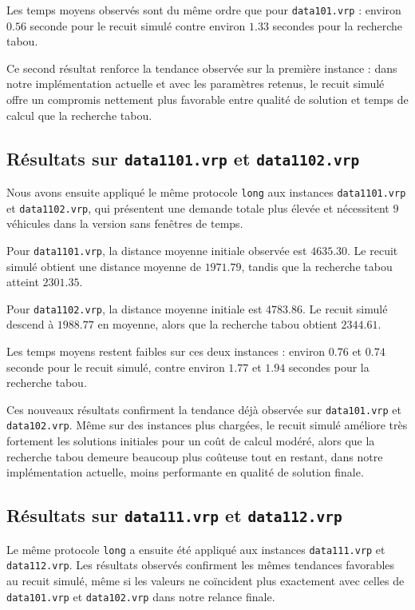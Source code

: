 \documentclass[11pt,a4paper]{article}
\begin{document}
Les temps moyens observés sont du même ordre que pour \texttt{data101.vrp} : environ \(0.56\) seconde pour le recuit simulé contre environ \(1.33\) secondes pour la recherche tabou.

Ce second résultat renforce la tendance observée sur la première instance : dans notre implémentation actuelle et avec les paramètres retenus, le recuit simulé offre un compromis nettement plus favorable entre qualité de solution et temps de calcul que la recherche tabou.

\subsection{Résultats sur \texttt{data1101.vrp} et \texttt{data1102.vrp}}
Nous avons ensuite appliqué le même protocole \texttt{long} aux instances \texttt{data1101.vrp} et \texttt{data1102.vrp}, qui présentent une demande totale plus élevée et nécessitent \(9\) véhicules dans la version sans fenêtres de temps.

Pour \texttt{data1101.vrp}, la distance moyenne initiale observée est \(4635.30\). Le recuit simulé obtient une distance moyenne de \(1971.79\), tandis que la recherche tabou atteint \(2301.35\).

Pour \texttt{data1102.vrp}, la distance moyenne initiale est \(4783.86\). Le recuit simulé descend à \(1988.77\) en moyenne, alors que la recherche tabou obtient \(2344.61\).

Les temps moyens restent faibles sur ces deux instances : environ \(0.76\) et \(0.74\) seconde pour le recuit simulé, contre environ \(1.77\) et \(1.94\) secondes pour la recherche tabou.

Ces nouveaux résultats confirment la tendance déjà observée sur \texttt{data101.vrp} et \texttt{data102.vrp}. Même sur des instances plus chargées, le recuit simulé améliore très fortement les solutions initiales pour un coût de calcul modéré, alors que la recherche tabou demeure beaucoup plus coûteuse tout en restant, dans notre implémentation actuelle, moins performante en qualité de solution finale.

\subsection{Résultats sur \texttt{data111.vrp} et \texttt{data112.vrp}}
Le même protocole \texttt{long} a ensuite été appliqué aux instances \texttt{data111.vrp} et \texttt{data112.vrp}. Les résultats observés confirment les mêmes tendances favorables au recuit simulé, même si les valeurs ne coïncident plus exactement avec celles de \texttt{data101.vrp} et \texttt{data102.vrp} dans notre relance finale.
\end{document}
